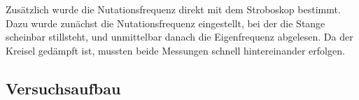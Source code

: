 
Zusätzlich wurde die Nutationsfrequenz direkt mit dem Stroboskop bestimmt.  
Dazu wurde zunächst die Nutationsfrequenz eingestellt, bei der die Stange scheinbar stillsteht, und unmittelbar danach die Eigenfrequenz abgelesen.  
Da der Kreisel gedämpft ist, mussten beide Messungen schnell hintereinander erfolgen.

\subsection{Versuchsaufbau}

